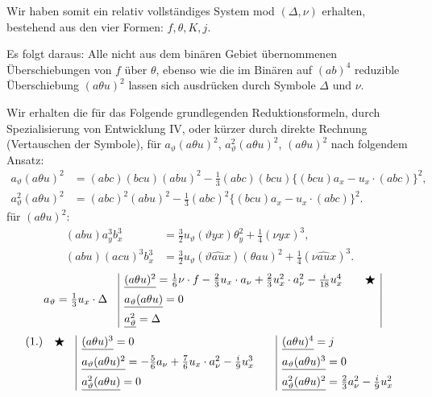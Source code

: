 Wir haben somit ein relativ vollständiges System mod $(\Delta,\nu)$ erhalten, bestehend aus den vier Formen: $f,\theta,K,j$.

Es folgt daraus: Alle nicht aus dem binären Gebiet übernommenen Überschiebungen von $f$ über $\theta$, ebenso wie die im Binären auf $(ab)^4$ reduzible Überschiebung $(a\theta u)^2$ lassen sich ausdrücken durch Symbole $\Delta$ und $\nu$.

Wir erhalten die für das Folgende grundlegenden Reduktionsformeln, durch Spezialisierung von Entwicklung IV, oder kürzer durch direkte Rechnung (Vertauschen der Symbole), für $a_\vartheta(a\theta u)^2$, $a_\vartheta^2(a\theta u)^2$, $(a\theta u)^2$ nach folgendem Ansatz:
\[
\begin{aligned}
a_\vartheta(a\theta u)^2
&=(abc)(bcu)(abu)^2-\frac13(abc)(bcu)\{(bcu)a_x-u_x\cdot(abc)\}^2,\\
a_\vartheta^2(a\theta u)^2
&=(abc)^2(abu)^2-\frac13(abc)^2\{(bcu)a_x-u_x\cdot(abc)\}^2.
\end{aligned}
\]
für $(a\theta u)^2$:
\[
\begin{aligned}
(abu)a_y^3b_x^3&=\frac32u_\vartheta(\vartheta yx)\theta_y^2+\frac14(\nu yx)^3,\\
(abu)(acu)^3b_x^3&=\frac32u_\vartheta(\vartheta\widehat{au}x)(\theta au)^2+\frac14(\nu\widehat{au}x)^3.
\end{aligned}
\]
\begingroup\small
\[
\begin{array}{r@{\quad}|l@{\qquad}c|}
& \underline{(a\theta u)^2}=\frac16\nu\cdot f-\frac23u_x\cdot a_\nu+\frac23u_x^2\cdot a_\nu^2-\frac{i}{18}u_x^4
& \bigstar\\[0.55em]
a_\vartheta=\frac13u_x\cdot\Delta
& \underline{a_\vartheta(a\theta u)}=0
& \\[0.55em]
& \underline{a_\vartheta^2}=\Delta
&
\end{array}
\]
\vspace{-0.5em}
\[
\begin{array}{r@{\quad}c@{\quad}|l@{\qquad}|l}
(1.) & \bigstar
& \underline{(a\theta u)^3}=0
& \underline{(a\theta u)^4}=j\\[0.55em]
&
& \underline{a_\vartheta(a\theta u)^2}=-\frac56a_\nu+\frac76u_x\cdot a_\nu^2-\frac{i}{9}u_x^3
& \underline{a_\vartheta(a\theta u)^3}=0\\[0.55em]
&
& \underline{a_\vartheta^2(a\theta u)}=0
& \underline{a_\vartheta^2(a\theta u)^2}=\frac23a_\nu^2-\frac{i}{9}u_x^2
\end{array}
\]
\endgroup

